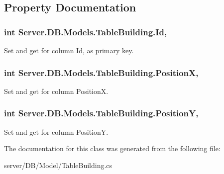 \subsection{Property Documentation}
\hypertarget{classServer_1_1DB_1_1Models_1_1TableBuilding_a9d598f41ae682a64c7c9cd05e5fcfd97}{
\subsubsection[{Id}]{\setlength{\rightskip}{0pt plus 5cm}int Server.\-D\-B.\-Models.\-Table\-Building.\-Id\hspace{0.3cm}{\ttfamily [get]}, {\ttfamily [set]}}}\label{classServer_1_1DB_1_1Models_1_1TableBuilding_a9d598f41ae682a64c7c9cd05e5fcfd97}


Set and get for column Id, as primary key. 

\hypertarget{classServer_1_1DB_1_1Models_1_1TableBuilding_a51f82ae3d59ec5972f1203df61f835b7}{
\subsubsection[{Position\-X}]{\setlength{\rightskip}{0pt plus 5cm}int Server.\-D\-B.\-Models.\-Table\-Building.\-Position\-X\hspace{0.3cm}{\ttfamily [get]}, {\ttfamily [set]}}}\label{classServer_1_1DB_1_1Models_1_1TableBuilding_a51f82ae3d59ec5972f1203df61f835b7}


Set and get for column Position\-X. 

\hypertarget{classServer_1_1DB_1_1Models_1_1TableBuilding_ac12da5d0fc35d3fd054286c48e8e34d6}{
\subsubsection[{Position\-Y}]{\setlength{\rightskip}{0pt plus 5cm}int Server.\-D\-B.\-Models.\-Table\-Building.\-Position\-Y\hspace{0.3cm}{\ttfamily [get]}, {\ttfamily [set]}}}\label{classServer_1_1DB_1_1Models_1_1TableBuilding_ac12da5d0fc35d3fd054286c48e8e34d6}


Set and get for column Position\-Y. 



The documentation for this class was generated from the following file\-:\begin{DoxyCompactItemize}
\item 
server/\-D\-B/\-Model/Table\-Building.\-cs\end{DoxyCompactItemize}
